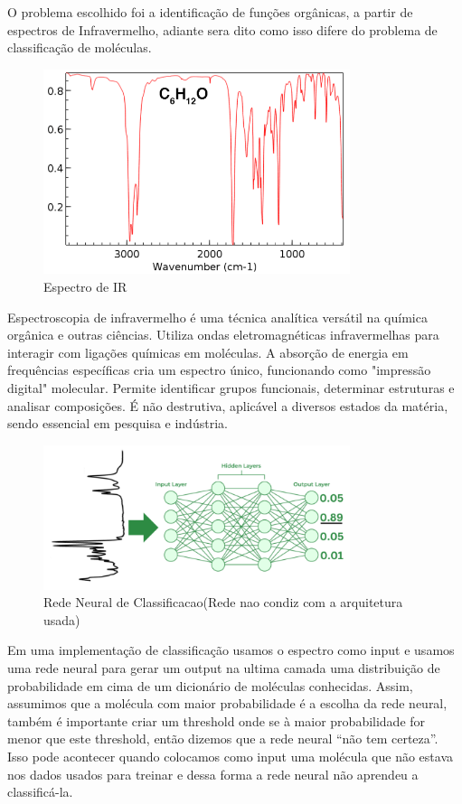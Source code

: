 \documentclass[11pt,a4paper]{article}
\begin{document}
O problema escolhido foi a identificação de funções orgânicas, a partir de espectros de Infravermelho, adiante sera dito como isso difere do problema de classificação de moléculas.


\begin{figure}[h]
    \centering
    \includegraphics[width=0.8\textwidth]{Images/spec.png}
    \caption{Espectro de IR}
    \label{fig:ir_spectrum}
\end{figure}

Espectroscopia de infravermelho é uma técnica analítica versátil na química orgânica e outras ciências. Utiliza ondas eletromagnéticas infravermelhas para interagir com ligações químicas em moléculas. A absorção de energia em frequências específicas cria um espectro único, funcionando como "impressão digital" molecular. Permite identificar grupos funcionais, determinar estruturas e analisar composições. É não destrutiva, aplicável a diversos estados da matéria, sendo essencial em pesquisa e indústria.

\begin{figure}[h]
    \centering
    \includegraphics[width=0.8\textwidth]{Images/NN2.png}
    \caption{Rede Neural de Classificacao(Rede nao condiz com a arquitetura usada)}
    \label{fig:ir_spectrum}
\end{figure}

Em uma implementação de classificação usamos o espectro como input e usamos uma rede neural para gerar um output na ultima camada uma distribuição de probabilidade em cima de um dicionário de moléculas conhecidas. Assim, assumimos que a molécula com maior probabilidade é a escolha da rede neural, também é importante criar um threshold onde se à maior probabilidade for menor que este threshold, então dizemos que a rede neural “não tem certeza”. Isso pode acontecer quando colocamos como input uma molécula que não estava nos dados usados para treinar e dessa forma a rede neural não aprendeu a classificá-la.
\end{document}
